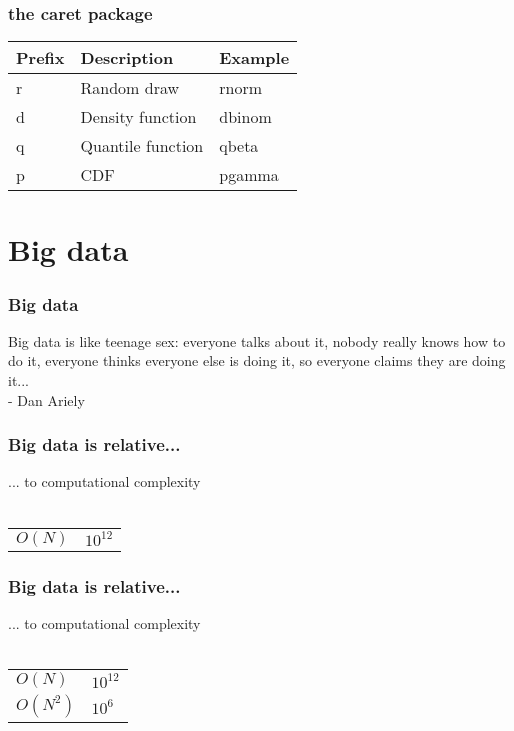 \documentclass{beamer}
\begin{document}
\begin{frame}
	\frametitle{the caret package}
	\begin{center}
	\begin{table}
		\begin{tabular}{l | l | l}
			\textbf{Prefix} & \textbf{Description} & \textbf{Example}\\
			\hline
			r & Random draw & rnorm \\
			\hline
			d & Density function & dbinom \\
			\hline
			q & Quantile function & qbeta \\
			\hline
			p & CDF & pgamma \\
		\end{tabular}
	\end{table}
\end{center}
\end{frame}

\section{Big data}

\begin{frame}
	\frametitle{Big data}
	Big data is like teenage sex:
	everyone talks about it,
	nobody really knows how to do it,
	everyone thinks everyone else is doing it,
	so everyone claims they are doing it...\\
	- Dan Ariely
\end{frame}

\begin{frame}
	\frametitle{Big data is relative...}
	\begin{center}
		... to computational complexity\\~\\
		\begin{tabular}{ l l }
			$O(N)$ & $10^{12}$ \\
		\end{tabular}
	\end{center}
\end{frame}

\begin{frame}
	\frametitle{Big data is relative...}
	\begin{center}
		... to computational complexity\\~\\
		\begin{tabular}{ l l }
			$O(N)$ & $10^{12}$ \\
			$O(N^2) $ & $ 10^{6}$\\
		\end{tabular}
	\end{center}
\end{frame}
\end{document}
